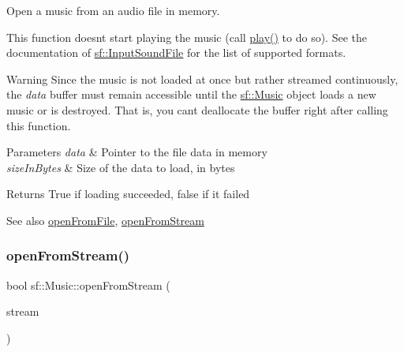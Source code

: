 Open a music from an audio file in memory. 

This function doesn\textquotesingle{}t start playing the music (call \mbox{\hyperlink{classsf_1_1_sound_stream_afdc08b69cab5f243d9324940a85a1144}{play()}} to do so). See the documentation of \mbox{\hyperlink{classsf_1_1_input_sound_file}{sf\+::\+Input\+Sound\+File}} for the list of supported formats.

\begin{DoxyWarning}{Warning}
Since the music is not loaded at once but rather streamed continuously, the {\itshape data} buffer must remain accessible until the \mbox{\hyperlink{classsf_1_1_music}{sf\+::\+Music}} object loads a new music or is destroyed. That is, you can\textquotesingle{}t deallocate the buffer right after calling this function.
\end{DoxyWarning}

\begin{DoxyParams}{Parameters}
{\em data} & Pointer to the file data in memory \\
\hline
{\em size\+In\+Bytes} & Size of the data to load, in bytes\\
\hline
\end{DoxyParams}
\begin{DoxyReturn}{Returns}
True if loading succeeded, false if it failed
\end{DoxyReturn}
\begin{DoxySeeAlso}{See also}
\mbox{\hyperlink{classsf_1_1_music_a3edc66e5f5b3f11e84b90eaec9c7d7c0}{open\+From\+File}}, \mbox{\hyperlink{classsf_1_1_music_a4e55d1910a26858b44778c26b237d673}{open\+From\+Stream}} \begin{DoxyVerb}\end{DoxyVerb}
 
\end{DoxySeeAlso}
\mbox{\label{classsf_1_1_music_a4e55d1910a26858b44778c26b237d673}} 
\subsubsection{\texorpdfstring{openFromStream()}{openFromStream()}}
{\footnotesize\ttfamily bool sf\+::\+Music\+::open\+From\+Stream (\begin{DoxyParamCaption}\item[{\mbox{\hyperlink{classsf_1_1_input_stream}{Input\+Stream}} \&}]{stream }\end{DoxyParamCaption})}




